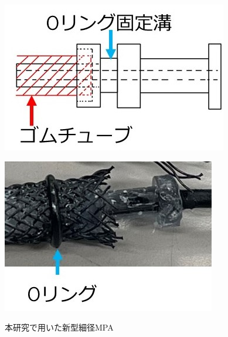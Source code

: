 \begin{figure}
  \begin{minipage}{0.5\hsize}
    \centering  
    \includegraphics[scale=0.6]{image/MPA_tanbu_2_1.jpg}
    \label{fig:MPA_tanbu_2_1}
  \end{minipage}
  \begin{minipage}{0.5\hsize}
    \centering
    \includegraphics[scale=0.6]{image/MPA_tanbu_2_2.jpg}
    \label{fig:MPA_tanbu_2_2}
  \end{minipage}
  \caption{本研究で用いた新型細径MPA}
  \label{fig:MPA_tanbu_2}
\end{figure}
